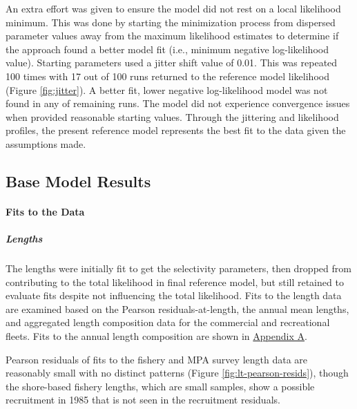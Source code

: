 \documentclass[11pt,
  english,
  letterpaper,
]{article}
\begin{document}
An extra effort was given to ensure the model did not rest on a local likelihood minimum. This was done by starting the minimization process from dispersed parameter values away from the maximum likelihood estimates to determine if the approach found a better model fit (i.e., minimum negative log-likelihood value). Starting parameters used a jitter shift value of 0.01. This was repeated 100 times with 17 out of 100 runs returned to the reference model likelihood (Figure \ref{fig:jitter}). A better fit, lower negative log-likelihood model was not found in any of remaining runs. The model did not experience convergence issues when provided reasonable starting values. Through the jittering and likelihood profiles, the present reference model represents the best fit to the data given the assumptions made.

\hypertarget{base-model-results}{%
\subsection{Base Model Results}\label{base-model-results}}

\hypertarget{fits-to-the-data}{%
\paragraph{Fits to the Data}\label{fits-to-the-data}}

\hypertarget{lengths}{%
\subparagraph{Lengths}\label{lengths}}

The lengths were initially fit to get the selectivity parameters, then dropped from contributing to the total likelihood in final reference model, but still retained to evaluate fits despite not influencing the total likelihood. Fits to the length data are examined based on the Pearson residuals-at-length, the annual mean lengths, and aggregated length composition data for the commercial and recreational fleets. Fits to the annual length composition are shown in \protect\hyperlink{app_a}{Appendix A}.

Pearson residuals of fits to the fishery and MPA survey length data are reasonably small with no distinct patterns (Figure \ref{fig:lt-pearson-resids}), though the shore-based fishery lengths, which are small samples, show a possible recruitment in 1985 that is not seen in the recruitment residuals.
\end{document}
